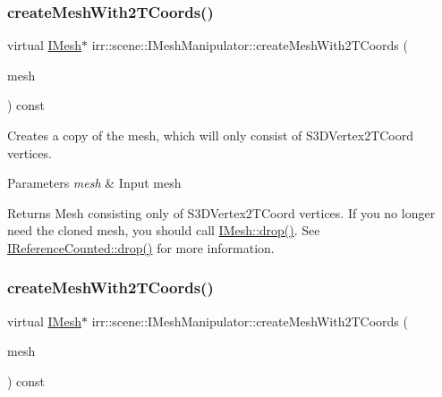 \subsubsection{\texorpdfstring{create\+Mesh\+With2\+T\+Coords()}{createMeshWith2TCoords()}\hspace{0.1cm}{\footnotesize\ttfamily [1/2]}}
{\footnotesize\ttfamily virtual \hyperlink{classirr_1_1scene_1_1IMesh}{I\+Mesh}$\ast$ irr\+::scene\+::\+I\+Mesh\+Manipulator\+::create\+Mesh\+With2\+T\+Coords (\begin{DoxyParamCaption}\item[{\hyperlink{classirr_1_1scene_1_1IMesh}{I\+Mesh} $\ast$}]{mesh }\end{DoxyParamCaption}) const\hspace{0.3cm}{\ttfamily [pure virtual]}}



Creates a copy of the mesh, which will only consist of S3\+D\+Vertex2\+T\+Coord vertices. 


\begin{DoxyParams}{Parameters}
{\em mesh} & Input mesh \\
\hline
\end{DoxyParams}
\begin{DoxyReturn}{Returns}
Mesh consisting only of S3\+D\+Vertex2\+T\+Coord vertices. If you no longer need the cloned mesh, you should call \hyperlink{classirr_1_1IReferenceCounted_a03856a09355b89d178090c4a5f738543}{I\+Mesh\+::drop()}. See \hyperlink{classirr_1_1IReferenceCounted_a03856a09355b89d178090c4a5f738543}{I\+Reference\+Counted\+::drop()} for more information. 
\end{DoxyReturn}
\mbox{\label{classirr_1_1scene_1_1IMeshManipulator_abf123f6fece99816be402e1edf70dc13}} 
\subsubsection{\texorpdfstring{create\+Mesh\+With2\+T\+Coords()}{createMeshWith2TCoords()}\hspace{0.1cm}{\footnotesize\ttfamily [2/2]}}
{\footnotesize\ttfamily virtual \hyperlink{classirr_1_1scene_1_1IMesh}{I\+Mesh}$\ast$ irr\+::scene\+::\+I\+Mesh\+Manipulator\+::create\+Mesh\+With2\+T\+Coords (\begin{DoxyParamCaption}\item[{\hyperlink{classirr_1_1scene_1_1IMesh}{I\+Mesh} $\ast$}]{mesh }\end{DoxyParamCaption}) const\hspace{0.3cm}{\ttfamily [pure virtual]}}



